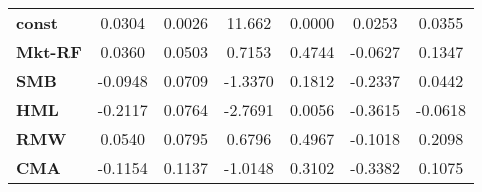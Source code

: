 \begin{center}
\begin{tabular}{lcccccc}
\midrule
\textbf{const}  &       0.0304       &       0.0026       &      11.662     &      0.0000      &       0.0253      &       0.0355       \\
\textbf{Mkt-RF} &       0.0360       &       0.0503       &      0.7153     &      0.4744      &      -0.0627      &       0.1347       \\
\textbf{SMB}    &      -0.0948       &       0.0709       &     -1.3370     &      0.1812      &      -0.2337      &       0.0442       \\
\textbf{HML}    &      -0.2117       &       0.0764       &     -2.7691     &      0.0056      &      -0.3615      &      -0.0618       \\
\textbf{RMW}    &       0.0540       &       0.0795       &      0.6796     &      0.4967      &      -0.1018      &       0.2098       \\
\textbf{CMA}    &      -0.1154       &       0.1137       &     -1.0148     &      0.3102      &      -0.3382      &       0.1075       \\
\bottomrule
\end{tabular}
\end{center}
